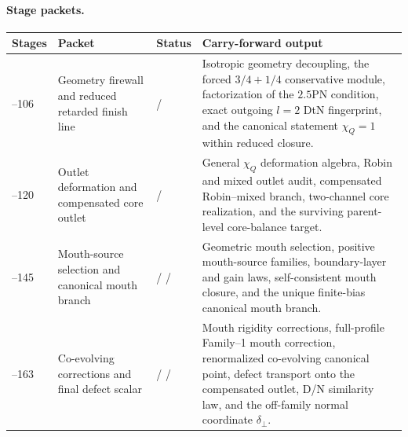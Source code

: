 \paragraph{Stage packets.}
\begin{center}
\small
\begin{tabular}{@{}>{\raggedright\arraybackslash}p{}>{\raggedright\arraybackslash}p{}>{\raggedright\arraybackslash}p{}>{\raggedright\arraybackslash}p{}@{}}
\toprule
Stages & Packet & Status & Carry-forward output \\
\midrule
091--106 & Geometry firewall and reduced retarded finish line & \StatusExactClosure{} / \StatusOpen{} & Isotropic geometry decoupling, the forced \(3/4+1/4\) conservative module, factorization of the \(2.5\)PN condition, exact outgoing \(l=2\) DtN fingerprint, and the canonical statement \(\chi_Q=1\) within reduced closure. \\
\addlinespace
107--120 & Outlet deformation and compensated core outlet & \StatusExactClosure{} / \StatusReduced{} & General \(\chi_Q\) deformation algebra, Robin and mixed outlet audit, compensated Robin--mixed branch, two-channel core realization, and the surviving parent-level core-balance target. \\
\addlinespace
121--145 & Mouth-source selection and canonical mouth branch & \StatusExactClosure{} / \StatusReduced{} / \StatusNumerical{} & Geometric mouth selection, positive mouth-source families, boundary-layer and gain laws, self-consistent mouth closure, and the unique finite-bias canonical mouth branch. \\
\addlinespace
146--163 & Co-evolving corrections and final defect scalar & \StatusExactClosure{} / \StatusNumerical{} / \StatusOpen{} & Mouth rigidity corrections, full-profile Family--1 mouth correction, renormalized co-evolving canonical point, defect transport onto the compensated outlet, D/N similarity law, and the off-family normal coordinate \(\delta_\perp\). \\
\bottomrule
\end{tabular}
\end{center}


